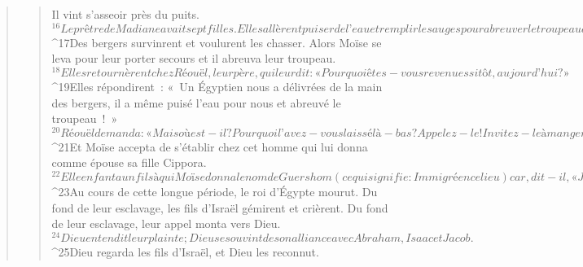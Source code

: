 \begin{verse}
\begin{verse}
      Il vint s’asseoir près du puits. 
${}^{16}Le prêtre de Madiane avait sept filles. Elles allèrent puiser de l’eau et remplir les auges pour abreuver le troupeau de leur père. 
${}^{17}Des bergers survinrent et voulurent les chasser. Alors Moïse se leva pour leur porter secours et il abreuva leur troupeau. 
${}^{18}Elles retournèrent chez Réouël, leur père, qui leur dit : « Pourquoi êtes-vous revenues si tôt, aujourd’hui ? » 
${}^{19}Elles répondirent : « Un Égyptien nous a délivrées de la main des bergers, il a même puisé l’eau pour nous et abreuvé le troupeau ! » 
${}^{20}Réouël demanda : « Mais où est-il ? Pourquoi l’avez-vous laissé là-bas ? Appelez-le ! Invitez-le à manger ! » 
${}^{21}Et Moïse accepta de s’établir chez cet homme qui lui donna comme épouse sa fille Cippora. 
${}^{22}Elle enfanta un fils à qui Moïse donna le nom de Guershom (ce qui signifie : Immigré en ce lieu) car, dit-il, « Je suis devenu un immigré en terre étrangère ».
${}^{23}Au cours de cette longue période, le roi d’Égypte mourut. Du fond de leur esclavage, les fils d’Israël gémirent et crièrent. Du fond de leur esclavage, leur appel monta vers Dieu. 
${}^{24}Dieu entendit leur plainte ; Dieu se souvint de son alliance avec Abraham, Isaac et Jacob. 
${}^{25}Dieu regarda les fils d’Israël, et Dieu les reconnut.
      

\end{verse}
\end{verse}
